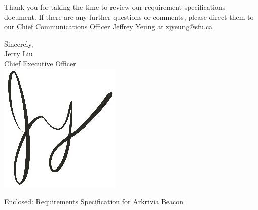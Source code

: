 \documentclass[11pt]{letter}
\begin{document}
\begin{letter}
\medskip
Thank you for taking the time to review our requirement specifications document. If there are any further questions or comments, please direct them to our Chief Communications Officer Jeffrey Yeung at zjyeung@sfu.ca

\medskip
Sincerely,\\
Jerry Liu\\
Chief Executive Officer\\

\vspace*{-0.25cm}
\includegraphics[scale=0.8]{./images/signature.jpg}

{Enclosed: Requirements Specification for Arkrivia Beacon}

\end{letter}
\end{document}
